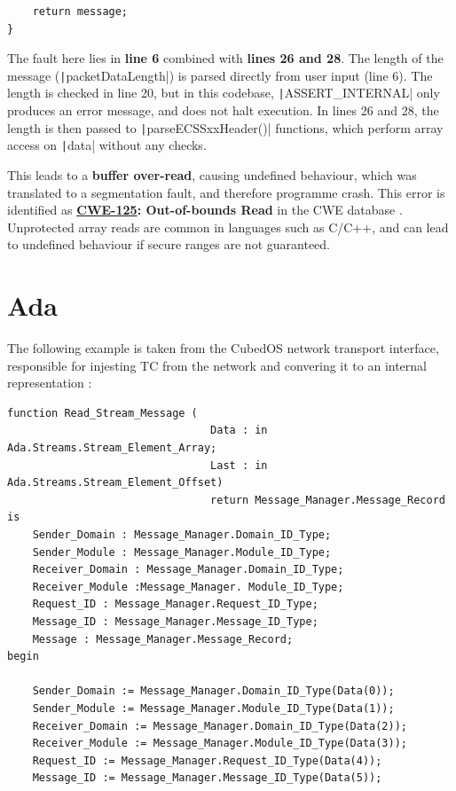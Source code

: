 \documentclass[a4paper,nobib,justified,final]{tufte-book}
\begin{document}
\begin{fullwidth}
\begin{verbatim}
	return message;
}
\end{verbatim}
The fault here lies in \textbf{line 6} combined with \textbf{lines 26 and 28}. The length of the message (\texttt|packetDataLength|) is parsed directly from user input (line 6). The length is checked in line 20, but in this codebase, \texttt|ASSERT_INTERNAL| only produces an error message, and does not halt execution. In lines 26 and 28, the length is then passed to \texttt|parseECSSxxHeader()| functions, which perform array access on \texttt|data| without any checks.

This leads to a \textbf{buffer over-read}, causing undefined behaviour, which was translated to a segmentation fault, and therefore programme crash. This error is identified as \textbf{\href{https://cwe.mitre.org/data/definitions/125.html}{CWE-125}: Out-of-bounds Read} in the \acs{CWE} database \cite{021_Martin_revised}. Unprotected array reads are common in languages such as C/C++, and can lead to undefined behaviour if secure ranges are not guaranteed.

\section*{Ada}

The following example is taken from the CubedOS network transport interface, responsible for injesting \acs{TC} from the network and convering it to an internal representation \cite{brandonCubedOSVerifiedCubeSat2017}:
\begin{verbatim}
function Read_Stream_Message (
								Data : in Ada.Streams.Stream_Element_Array;
								Last : in Ada.Streams.Stream_Element_Offset)
								return Message_Manager.Message_Record is
	Sender_Domain : Message_Manager.Domain_ID_Type;
	Sender_Module : Message_Manager.Module_ID_Type;
	Receiver_Domain : Message_Manager.Domain_ID_Type;
	Receiver_Module :Message_Manager. Module_ID_Type;
	Request_ID : Message_Manager.Request_ID_Type;
	Message_ID : Message_Manager.Message_ID_Type;
	Message : Message_Manager.Message_Record;
begin

	Sender_Domain := Message_Manager.Domain_ID_Type(Data(0));
	Sender_Module := Message_Manager.Module_ID_Type(Data(1));
	Receiver_Domain := Message_Manager.Domain_ID_Type(Data(2));
	Receiver_Module := Message_Manager.Module_ID_Type(Data(3));
	Request_ID := Message_Manager.Request_ID_Type(Data(4));
	Message_ID := Message_Manager.Message_ID_Type(Data(5));


\end{verbatim}
\end{fullwidth}
\end{document}
